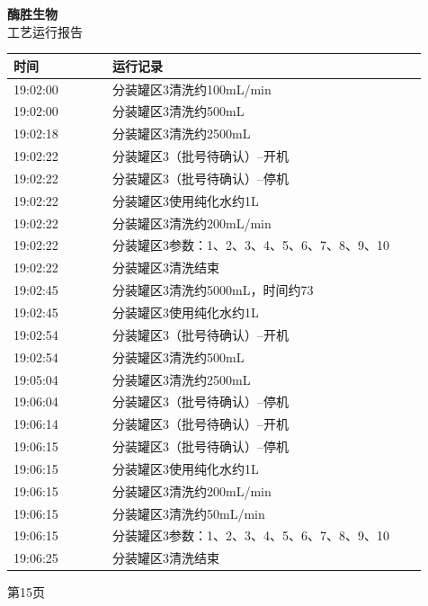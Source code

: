 \documentclass[UTF8,10pt,a4paper,fontset=fandol]{ctexart}
\begin{document}
\vspace{8pt}

\noindent
\begin{minipage}[t]{0.48\linewidth}
\centering
\textbf{酶胜生物}\\[2pt]
工艺运行报告

\smallskip
\begin{tabular}{|p{0.22\linewidth}|p{0.70\linewidth}|}
\hline
时间 & 运行记录\\ \hline
19:02:00 & 分装罐区3清洗约100mL/min\\ \hline
19:02:00 & 分装罐区3清洗约500mL\\ \hline
19:02:18 & 分装罐区3清洗约2500mL\\ \hline
19:02:22 & 分装罐区3（批号待确认）--开机\\ \hline
19:02:22 & 分装罐区3（批号待确认）--停机\\ \hline
19:02:22 & 分装罐区3使用纯化水约1L\\ \hline
19:02:22 & 分装罐区3清洗约200mL/min\\ \hline
19:02:22 & 分装罐区3参数：1、2、3、4、5、6、7、8、9、10\\ \hline
19:02:22 & 分装罐区3清洗结束\\ \hline
19:02:45 & 分装罐区3清洗约5000mL，时间约73\\ \hline
19:02:45 & 分装罐区3使用纯化水约1L\\ \hline
19:02:54 & 分装罐区3（批号待确认）--开机\\ \hline
19:02:54 & 分装罐区3清洗约500mL\\ \hline
19:05:04 & 分装罐区3清洗约2500mL\\ \hline
19:06:04 & 分装罐区3（批号待确认）--停机\\ \hline
19:06:14 & 分装罐区3（批号待确认）--开机\\ \hline
19:06:15 & 分装罐区3（批号待确认）--停机\\ \hline
19:06:15 & 分装罐区3使用纯化水约1L\\ \hline
19:06:15 & 分装罐区3清洗约200mL/min\\ \hline
19:06:15 & 分装罐区3清洗约50mL/min\\ \hline
19:06:15 & 分装罐区3参数：1、2、3、4、5、6、7、8、9、10\\ \hline
19:06:25 & 分装罐区3清洗结束\\ \hline
\end{tabular}

\vspace{2pt}
第15页
\end{minipage}
\end{document}

